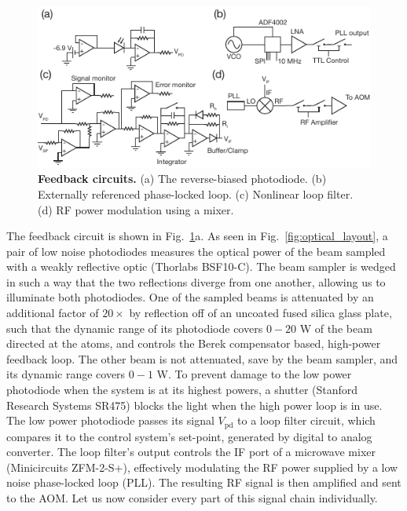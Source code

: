 \documentclass[twocolumn,aps,pra,showpacs,preprintnumbers,bibnotes]{revtex4-1}
\begin{document}
\begin{figure}
  \begin{center}
    \includegraphics{Figure6.pdf}
    \caption{\textbf{Feedback circuits.} (a) The reverse-biased photodiode. (b) Externally referenced phase-locked loop. (c) Nonlinear loop filter. (d) RF power modulation using a mixer.}\label{fig:circuits}
  \end{center}
\end{figure}
The feedback circuit is shown in Fig.~\ref{fig:circuits}a. As seen in Fig.~\ref{fig:optical_layout}, a pair of low noise photodiodes measures the optical power of the beam sampled with a weakly reflective optic (Thorlabs BSF10-C).
The beam sampler is wedged in such a way that the two reflections diverge from one another, allowing us to illuminate both photodiodes.
One of the sampled beams is attenuated by an additional factor of $20\times$ by reflection off of an uncoated fused silica glass plate, such that the dynamic range of its photodiode covers $0-20$ W of the beam directed at the atoms, and controls the Berek compensator based, high-power feedback loop.
The other beam is not attenuated, save by the beam sampler, and its dynamic range covers $0-1$ W.
To prevent damage to the low power photodiode when the system is at its highest powers, a shutter (Stanford Research Systems SR475) blocks the light when the high power loop is in use.
The low power photodiode passes its signal $V_{\mathrm{pd}}$ to a loop filter circuit, which compares it to the control system's set-point, generated by digital to analog converter.
The loop filter's output controls the IF port of a microwave mixer (Minicircuits ZFM-2-S+), effectively modulating the RF power supplied by a low noise phase-locked loop (PLL).
The resulting RF signal is then amplified and sent to the AOM.
Let us now consider every part of this signal chain individually.
\end{document}
